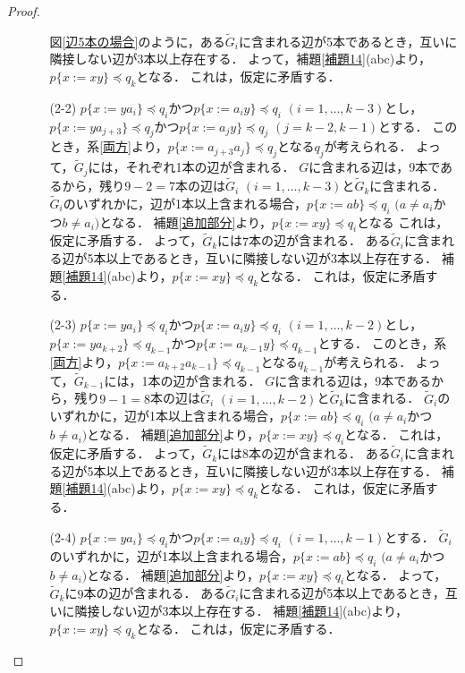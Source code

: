 \begin{proof}
\begin{enumerate}
\begin{enumerate}
図\ref{辺5本の場合}のように，ある$\tilde{G}_{i}$に含まれる辺が5本であるとき，互いに隣接しない辺が3本以上存在する．
よって，補題\ref{補題14}(abc)より，$p \{x:=xy \} \preceq q_{k}$となる．
これは，仮定に矛盾する．

\item[\textrm{(2-2)}]
$p \{ x:=ya_{i} \} \preceq q_{i}$かつ$p \{ x:=a_{i}y \} \preceq q_{i}$ $(i=1, \ldots, k-3)$とし，$p \{ x:=ya_{j+3} \} \preceq q_{j}$かつ$p \{ x:=a_{j}y \} \preceq q_{j}$ $(j=k-2,k-1)$とする．
このとき，系\ref{両方}より，$p \{ x:=a_{j+3}a_{j} \} \preceq q_{j}$となる$q_{j}$が考えられる．
よって，$\tilde{G}_{j}$には，それぞれ1本の辺が含まれる．
$G$に含まれる辺は，9本であるから，残り$9-2=7$本の辺は$\tilde{G}_{i}$ $(i=1, \ldots, k-3)$と$\tilde{G}_{k}$に含まれる．
$\tilde{G}_{i}$のいずれかに，辺が1本以上含まれる場合，$p \{ x:=ab \} \preceq q_{i}$ $(a \not = a_{i}$かつ$b \not = a_{i})$となる．
補題\ref{追加部分}より，$p \{ x:=xy \} \preceq q_{i}$となる
これは，仮定に矛盾する．
よって，$\tilde{G}_{k}$には$7$本の辺が含まれる．
ある$\tilde{G}_{i}$に含まれる辺が5本以上であるとき，互いに隣接しない辺が3本以上存在する．
補題\ref{補題14}(abc)より，$p \{x:=xy \} \preceq q_{k}$となる．
これは，仮定に矛盾する．

\item[\textrm{(2-3)}]
$p \{ x:=ya_{i} \} \preceq q_{i}$かつ$p \{ x:=a_{i}y \} \preceq q_{i}$ $(i=1, \ldots, k-2)$とし，$p \{ x:=ya_{k+2} \} \preceq q_{k-1}$かつ$p \{ x:=a_{k-1}y \} \preceq q_{k-1}$とする．
このとき，系\ref{両方}より，$p \{ x:=a_{k+2}a_{k-1} \} \preceq q_{k-1}$となる$q_{k-1}$が考えられる．
よって，$\tilde{G}_{k-1}$には，1本の辺が含まれる．
$G$に含まれる辺は，9本であるから，残り$9-1=8$本の辺は$\tilde{G}_{i}$ $(i=1, \ldots, k-2)$と$\tilde{G}_{k}$に含まれる．
$\tilde{G}_{i}$のいずれかに，辺が1本以上含まれる場合，$p \{ x:=ab \} \preceq q_{i}$ $(a \not = a_{i}$かつ$b \not = a_{i})$となる．
補題\ref{追加部分}より，$p \{ x:=xy \} \preceq q_{i}$となる．
これは，仮定に矛盾する．
よって，$\tilde{G}_{k}$には$8$本の辺が含まれる．
ある$\tilde{G}_{i}$に含まれる辺が5本以上であるとき，互いに隣接しない辺が3本以上存在する．
補題\ref{補題14}(abc)より，$p \{x:=xy \} \preceq q_{k}$となる．
これは，仮定に矛盾する．

\item[\textrm{(2-4)}] 
$p \{ x:=ya_{i} \} \preceq q_{i}$かつ$p \{ x:=a_{i}y \} \preceq q_{i}$ $(i=1, \ldots, k-1)$とする．
$\tilde{G}_{i}$のいずれかに，辺が1本以上含まれる場合，$p \{ x:=ab \} \preceq q_{i}$ $(a \not = a_{i}$かつ$b \not = a_{i})$となる．
補題\ref{追加部分}より，$p \{ x:=xy \} \preceq q_{i}$となる．
よって，$\tilde{G}_{k}$に$9$本の辺が含まれる．
ある$\tilde{G}_{i}$に含まれる辺が5本以上であるとき，互いに隣接しない辺が3本以上存在する．
補題\ref{補題14}(abc)より，$p \{x:=xy \} \preceq q_{k}$となる．
これは，仮定に矛盾する．
\end{enumerate}


\end{enumerate}
\end{proof}
